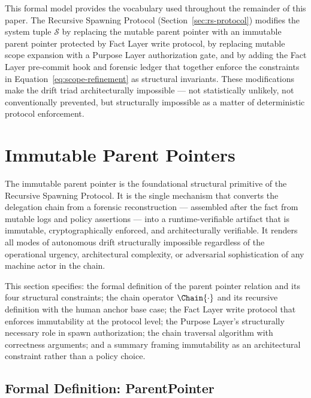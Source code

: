\documentclass[12pt]{article}
\begin{document}
This formal model provides the vocabulary used throughout the remainder of this paper. The Recursive Spawning Protocol (Section~\ref{sec:rs-protocol}) modifies the system tuple $\mathcal{S}$ by replacing the mutable parent pointer with an immutable parent pointer protected by Fact Layer write protocol, by replacing mutable scope expansion with a Purpose Layer authorization gate, and by adding the Fact Layer pre-commit hook and forensic ledger that together enforce the constraints in Equation~\ref{eq:scope-refinement} as structural invariants. These modifications make the drift triad architecturally impossible — not statistically unlikely, not conventionally prevented, but structurally impossible as a matter of deterministic protocol enforcement.\section{Immutable Parent Pointers}
\label{sec:immutable-parent-pointers}

The immutable parent pointer is the foundational structural primitive of the Recursive Spawning Protocol. It is the single mechanism that converts the delegation chain from a forensic reconstruction — assembled after the fact from mutable logs and policy assertions — into a runtime-verifiable artifact that is immutable, cryptographically enforced, and architecturally verifiable. It renders all modes of autonomous drift structurally impossible regardless of the operational urgency, architectural complexity, or adversarial sophistication of any machine actor in the chain.

This section specifies: the formal definition of the parent pointer relation and its four structural constraints; the chain operator $\Chain{\cdot}$ and its recursive definition with the human anchor base case; the Fact Layer write protocol that enforces immutability at the protocol level; the Purpose Layer's structurally necessary role in spawn authorization; the chain traversal algorithm with correctness arguments; and a summary framing immutability as an architectural constraint rather than a policy choice.

\subsection{Formal Definition: ParentPointer}
\label{sec:parent-pointer-formal}
\end{document}
